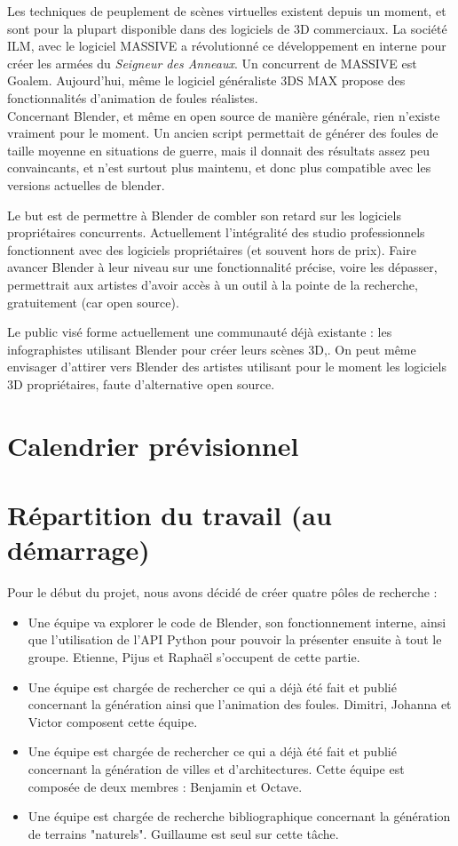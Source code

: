 \documentclass[a4paper,12pt]{article}
\begin{document}
Les techniques de peuplement de scènes virtuelles existent depuis un moment, et sont pour la plupart disponible dans des logiciels de 3D commerciaux. La société ILM, avec le logiciel MASSIVE\cite{Massive} a révolutionné ce développement en interne pour créer les armées du \textit{Seigneur des Anneaux}. Un concurrent de MASSIVE est Goalem\cite{Golaem}. Aujourd'hui, même le logiciel généraliste 3DS MAX\cite{3dsmax} propose des fonctionnalités d'animation de foules réalistes. \\
Concernant Blender, et même en  open source de manière générale, rien n'existe vraiment pour le moment. Un ancien script permettait de générer des foules de taille moyenne en situations de guerre, mais il donnait des résultats assez peu convaincants, et n'est surtout plus maintenu, et donc plus compatible avec les versions actuelles de blender.

Le but est de permettre à Blender de combler son retard sur les logiciels propriétaires concurrents. Actuellement l'intégralité des studio professionnels fonctionnent avec des logiciels propriétaires (et souvent hors de prix). Faire avancer Blender à leur niveau sur une fonctionnalité précise, voire les dépasser, permettrait aux artistes d'avoir accès à un outil à la pointe de la recherche, gratuitement (car open source).

Le public visé forme actuellement une communauté déjà existante : les infographistes utilisant Blender pour créer leurs scènes 3D,. On peut même envisager d'attirer vers Blender des artistes utilisant pour le moment les logiciels 3D propriétaires, faute d'alternative open source.

\section{Calendrier prévisionnel}

\section{Répartition du travail (au démarrage)}

Pour le début du projet, nous avons décidé de créer quatre pôles de recherche :
\begin{itemize}
\item Une équipe va explorer le code de Blender, son fonctionnement interne, ainsi que l'utilisation de l'API Python pour pouvoir la présenter ensuite à tout le groupe. Etienne, Pijus et Raphaël s'occupent de cette partie. 
\item Une équipe est chargée de rechercher ce qui a déjà été fait et publié concernant la génération ainsi que l'animation des foules. Dimitri, Johanna et Victor composent cette équipe.
\item Une équipe est chargée de rechercher ce qui a déjà été fait et publié concernant la génération de villes et d'architectures. Cette équipe est composée de deux membres : Benjamin et Octave.
\item Une équipe est chargée de recherche bibliographique concernant la génération de terrains "naturels". Guillaume est seul sur cette tâche.
\end{itemize}
\end{document}
